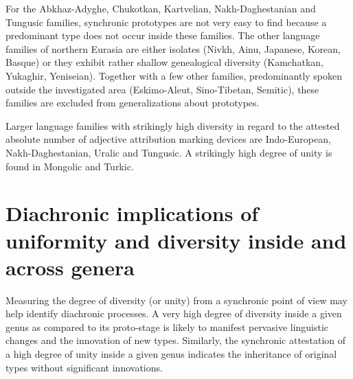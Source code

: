 For the Abkhaz-Adyghe, Chukotkan, Kartvelian, Nakh-Daghestanian and Tungusic families, synchronic prototypes are not very easy to find because a predominant type does not occur inside these families. The other language families of northern Eurasia are either isolates (Nivkh, Ainu, Japanese, Korean, Basque) or they exhibit rather shallow genealogical diversity (Kamchatkan, Yukaghir, Yeniseian). Together with a few other families, predominantly spoken outside the investigated area (Eskimo-Aleut, Sino-Tibetan, Semitic), these families are excluded from generalizations about prototypes. 

Larger language families with strikingly high diversity in regard to the attested absolute number of adjective attribution marking devices are Indo-European, Nakh-Daghestanian, Uralic and Tungusic. A strikingly high degree of unity is found in Mongolic and Turkic.

\section[Diachronic implications]{Diachronic implications of uniformity and diversity inside and across genera}
Measuring the degree of diversity (or unity) from a synchronic point of view may help identify diachronic processes. A very high degree of diversity inside a given genus as compared to its proto-stage is likely to manifest pervasive linguistic changes and the innovation of new types. Similarly, the synchronic attestation of a high degree of unity inside a given genus indicates the inheritance of original types without significant innovations. 

